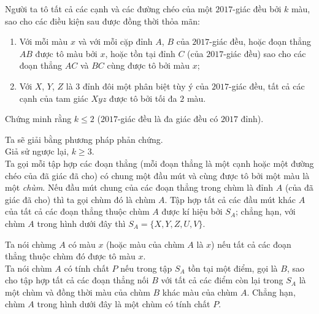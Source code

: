 \begin{bt}%
	Người ta tô tất cả các cạnh và các đường chéo của một $2017$-giác đều bởi $k$ màu, sao cho các điều kiện sau được đồng thời thỏa mãn:
	\begin{enumerate}[1/]
		\item Với mỗi màu $x$ và với mỗi cặp đỉnh $A$, $B$ của $2017$-giác đều, hoặc đoạn thẳng $AB$ được tô màu bởi $x$, hoặc tồn tại đỉnh $C$ (của $2017$-giác đều) sao cho các đoạn thẳng $AC$ và $BC$ cùng được tô bởi màu $x$;
		\item Với $X$, $Y$, $Z$ là $3$ đỉnh đôi một phân biệt tùy ý của $2017$-giác đều, tất cả các cạnh của tam giác $Xyz$ được tô bởi tối đa $2$ màu.
	\end{enumerate}
	Chứng minh rằng $k\le 2$ ($2017$-giác đều là đa giác đều có $2017$ đỉnh).
	\loigiai
	{Ta sẽ giải bằng phương pháp phản chứng. \\
		Giả sử ngược lại, $k\ge 3$.\\
		Ta gọi mỗi tập hợp các đoạn thẳng (mỗi đoạn thẳng là một cạnh hoặc một đường chéo của đã giác đã cho) có chung một đầu mút và cùng được tô bởi một màu là một \textit{chùm}. Nếu đầu mút chung của các đoạn thẳng trong chùm là đỉnh $A$ (của đã giác đã cho) thì ta gọi chùm đó là chùm $A$. Tập hợp tất cả các đầu mút khác $A$ của tất cả các đoạn thẳng thuộc chùm $A$ được kí hiệu bởi $S_A$; chẳng hạn, với chùm $A$ trong hình dưới đây thì $S_A=\{X,Y,Z,U,V\}$.
		\begin{center}
		\end{center}
		Ta nói chùmg $A$ có màu $x$ (hoặc màu của chùm $A$ là $x$) nếu tất cả các đoạn thẳng thuộc chùm đó được tô màu $x$.\\
		Ta nói chùm $A$ có tính chất $P$ nếu trong tập $S_A$ tồn tại một điểm, gọi là $B$, sao cho tập hợp tất cả các đoạn thẳng nối $B$ với tất cả các điểm còn lại trong $S_A$ là một chùm và đồng thời màu của chùm $B$ khác màu của chùm $A$. Chẳng hạn, chùm $A$ trong hình dưới đây là một chùm có tính chất $P$.
		\begin{center}

\end{center}}
\end{bt}
